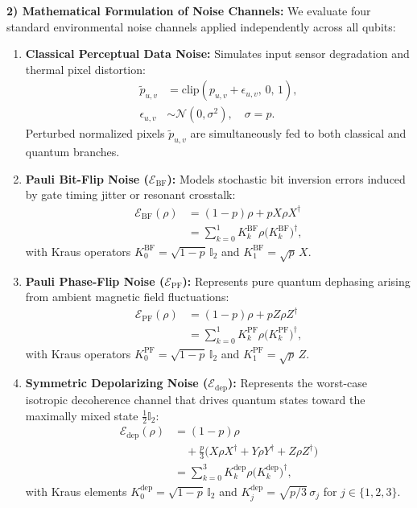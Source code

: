 \documentclass[pdflatex,sn-mathphys-num]{sn-jnl}%
\theoremstyle{thmstyleone}%
\theoremstyle{thmstyletwo}%
\theoremstyle{thmstylethree}%
\begin{document}
\textbf{2) Mathematical Formulation of Noise Channels:}
We evaluate four standard environmental noise channels applied independently across all qubits:
\begin{enumerate}
    \item \textbf{Classical Perceptual Data Noise:} Simulates input sensor degradation and thermal pixel distortion:
    \begin{align}
    \tilde{p}_{u,v} &= \mathrm{clip}\left( p_{u,v} + \epsilon_{u,v}, \, 0, \, 1 \right), \nonumber \\
    \epsilon_{u,v} &\sim \mathcal{N}(0, \sigma^2), \quad \sigma = p.
    \label{eq:data_noise_formulation}
    \end{align}
    Perturbed normalized pixels $\tilde{p}_{u,v}$ are simultaneously fed to both classical and quantum branches.
    \item \textbf{Pauli Bit-Flip Noise ($\mathcal{E}_{\mathrm{BF}}$):} Models stochastic bit inversion errors induced by gate timing jitter or resonant crosstalk:
    \begin{align}
    \mathcal{E}_{\mathrm{BF}}(\rho) &= (1-p)\rho + p X \rho X^\dagger \nonumber \\
    &= \sum_{k=0}^{1} K_k^{\mathrm{BF}} \rho \big(K_k^{\mathrm{BF}}\big)^\dagger,
    \label{eq:bit_flip_formulation}
    \end{align}
    with Kraus operators $K_0^{\mathrm{BF}} = \sqrt{1-p}\,\mathbb{I}_2$ and $K_1^{\mathrm{BF}} = \sqrt{p}\,X$.
    \item \textbf{Pauli Phase-Flip Noise ($\mathcal{E}_{\mathrm{PF}}$):} Represents pure quantum dephasing arising from ambient magnetic field fluctuations:
    \begin{align}
    \mathcal{E}_{\mathrm{PF}}(\rho) &= (1-p)\rho + p Z \rho Z^\dagger \nonumber \\
    &= \sum_{k=0}^{1} K_k^{\mathrm{PF}} \rho \big(K_k^{\mathrm{PF}}\big)^\dagger,
    \label{eq:phase_flip_formulation}
    \end{align}
    with Kraus operators $K_0^{\mathrm{PF}} = \sqrt{1-p}\,\mathbb{I}_2$ and $K_1^{\mathrm{PF}} = \sqrt{p}\,Z$.
    \item \textbf{Symmetric Depolarizing Noise ($\mathcal{E}_{\mathrm{dep}}$):} Represents the worst-case isotropic decoherence channel that drives quantum states toward the maximally mixed state $\frac{1}{2}\mathbb{I}_2$:
    \begin{align}
    \mathcal{E}_{\mathrm{dep}}(\rho) &= (1-p)\rho \nonumber \\
    &\quad + \frac{p}{3} \big( X\rho X^\dagger + Y\rho Y^\dagger + Z\rho Z^\dagger \big) \nonumber \\
    &= \sum_{k=0}^{3} K_k^{\mathrm{dep}} \rho \big(K_k^{\mathrm{dep}}\big)^\dagger,
    \label{eq:depolarizing_formulation}
    \end{align}
    with Kraus elements $K_0^{\mathrm{dep}} = \sqrt{1-p}\,\mathbb{I}_2$ and $K_j^{\mathrm{dep}} = \sqrt{p/3}\,\sigma_j$ for $j \in \{1, 2, 3\}$.
\end{enumerate}
\end{document}
